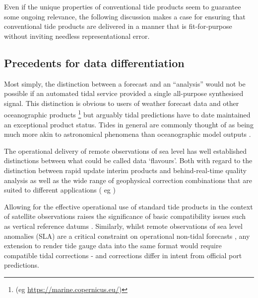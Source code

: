 Even if the unique properties of conventional tide products seem to guarantee some ongoing relevance, the following discussion makes a case for ensuring that conventional tide products are delivered in a manner that is fit-for-purpose without inviting needless representational error. 


\subsection{Precedents for data differentiation}

Most simply, the distinction between a forecast and an ``analysis'' would not be possible if an automated tidal service provided a single all-purpose synthesised signal.
This distinction is obvious to users of weather forecast data and other oceanographic products \footnote{(eg \url{https://marine.copernicus.eu/})} but arguably tidal predictions have to date maintained an exceptional product status.  Tides in general are commonly thought of as being much more akin to astronomical phenomena than oceanographic model outputs \citep{Jay:2003bj} \citep{10.1029/2018rg000636}.


The operational delivery of remote  observations of sea level has well established distinctions between what could be called data `flavours'.   Both with regard to the distinction between rapid update interim products and behind-real-time quality analysis as well as the wide range of geophysical  correction combinations that are suited to different applications ( eg \citep{Scharroo:2014vv} )


Allowing for the effective operational use of standard tide products in the context of satellite observations raises the significance of basic compatibility 
issues such as vertical reference datums \citep{10.3389/fmars.2020.549467}.
Similarly, whilst remote observations of sea level anomalies (SLA) are a critical constraint on operational non-tidal forecasts \citep{10.1080/1755876x.2019.1685834}, any extension to render tide gauge data into the same format would require compatible tidal corrections - and corrections differ in intent from official port predictions.


